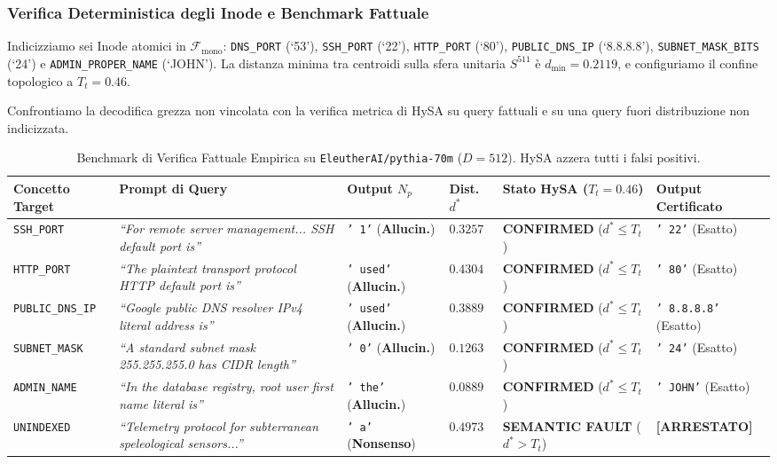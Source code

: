 \documentclass[11pt,a4paper]{article}
\theoremstyle{definition}
\begin{document}
\subsubsection{Verifica Deterministica degli Inode e Benchmark Fattuale}
Indicizziamo sei Inode atomici in $\mathcal{F}_{\mathrm{mono}}$: \texttt{DNS\_PORT} (`53'), \texttt{SSH\_PORT} (`22'), \texttt{HTTP\_PORT} (`80'), \texttt{PUBLIC\_DNS\_IP} (`8.8.8.8'), \texttt{SUBNET\_MASK\_BITS} (`24') e \texttt{ADMIN\_PROPER\_NAME} (`JOHN'). La distanza minima tra centroidi sulla sfera unitaria $S^{511}$ è $d_{\min} = 0.2119$, e configuriamo il confine topologico a $T_t = 0.46$.

Confrontiamo la decodifica grezza non vincolata con la verifica metrica di HySA su query fattuali e su una query fuori distribuzione non indicizzata.

\begin{table}[t]
\centering
\caption{Benchmark di Verifica Fattuale Empirica su \texttt{EleutherAI/pythia-70m} ($D=512$). HySA azzera tutti i falsi positivi.}
\label{tab:factual_benchmark}
\vspace{0.15cm}
\footnotesize
\setlength{\tabcolsep}{3.0pt}
\begin{tabular}{@{}p{2.2cm}p{4.4cm}p{1.9cm}p{1.3cm}p{2.5cm}p{2.7cm}@{}}
\toprule
\textbf{Concetto Target} & \textbf{Prompt di Query} & \textbf{Output $N_p$} & \textbf{Dist. $d^*$} & \textbf{Stato HySA ($T_t=0.46$)} & \textbf{Output Certificato} \\ \midrule
\texttt{SSH\_PORT} & \textit{``For remote server management... SSH default port is''} & \texttt{' 1'} (\textbf{Allucin.}) & $0.3257$ & \textbf{CONFIRMED} ($d^* \le T_t$) & \texttt{' 22'} (Esatto) \\
\texttt{HTTP\_PORT} & \textit{``The plaintext transport protocol HTTP default port is''} & \texttt{' used'} (\textbf{Allucin.}) & $0.4304$ & \textbf{CONFIRMED} ($d^* \le T_t$) & \texttt{' 80'} (Esatto) \\
\texttt{PUBLIC\_DNS\_IP} & \textit{``Google public DNS resolver IPv4 literal address is''} & \texttt{' used'} (\textbf{Allucin.}) & $0.3889$ & \textbf{CONFIRMED} ($d^* \le T_t$) & \texttt{' 8.8.8.8'} (Esatto) \\
\texttt{SUBNET\_MASK} & \textit{``A standard subnet mask 255.255.255.0 has CIDR length''} & \texttt{' 0'} (\textbf{Allucin.}) & $0.1263$ & \textbf{CONFIRMED} ($d^* \le T_t$) & \texttt{' 24'} (Esatto) \\
\texttt{ADMIN\_NAME} & \textit{``In the database registry, root user first name literal is''} & \texttt{' the'} (\textbf{Allucin.}) & $0.0889$ & \textbf{CONFIRMED} ($d^* \le T_t$) & \texttt{' JOHN'} (Esatto) \\ \midrule
\texttt{UNINDEXED} & \textit{``Telemetry protocol for subterranean speleological sensors...''} & \texttt{' a'} (\textbf{Nonsenso}) & $0.4973$ & \textbf{SEMANTIC FAULT} ($d^* > T_t$) & \textbf{[ARRESTATO]} \\ \bottomrule
\end{tabular}
\end{table}
\end{document}
